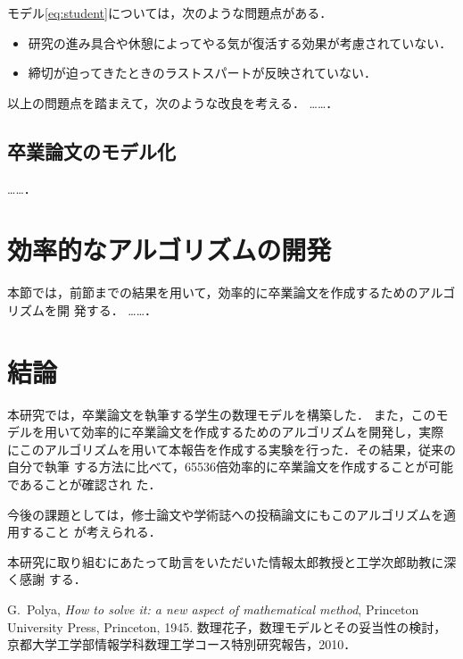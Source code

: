 \documentclass[dvipdfmx]{ampbt}
\begin{document}
モデル\eqref{eq:student}については，次のような問題点がある．
\begin{itemize}
\item 研究の進み具合や休憩によってやる気が復活する効果が考慮されていない．
\item 締切が迫ってきたときのラストスパートが反映されていない．
\end{itemize}

以上の問題点を踏まえて，次のような改良を考える．
……．

\subsection{卒業論文のモデル化}
……．

\section{効率的なアルゴリズムの開発}
本節では，前節までの結果を用いて，効率的に卒業論文を作成するためのアルゴリズムを開
発する．
……．

\section{結論}
本研究では，卒業論文を執筆する学生の数理モデルを構築した．
また，このモデルを用いて効率的に卒業論文を作成するためのアルゴリズムを開発し，実際
にこのアルゴリズムを用いて本報告を作成する実験を行った．その結果，従来の自分で執筆
する方法に比べて，65536倍効率的に卒業論文を作成することが可能であることが確認され
た．

今後の課題としては，修士論文や学術誌への投稿論文にもこのアルゴリズムを適用すること
が考えられる．

\acknowledgment
本研究に取り組むにあたって助言をいただいた情報太郎教授と工学次郎助教に深く感謝
する．

\begin{thebibliography}{10}
  G.~Polya, \textit{How to solve it: a new aspect of mathematical method},
  Princeton University Press, Princeton, 1945.
  数理花子，数理モデルとその妥当性の検討，
  京都大学工学部情報学科数理工学コース特別研究報告，2010．
\end{thebibliography}
% 
% 
\end{document}
